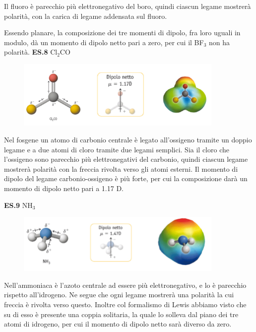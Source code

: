 Il fluoro è parecchio più elettronegativo del boro, quindi ciascun legame mostrerà polarità, con la carica di legame addensata sul fluoro.

Essendo planare, la composizione dei tre momenti di dipolo, fra loro uguali in modulo, dà un momento di dipolo netto pari a zero, per cui il BF$_3$ non ha polarità. 
\newpage
\vspace{0.2cm}\textbf{ES.8} Cl$_2$CO

\vspace{-0.3cm}\begin{figure}[htp]
    \centering
    \includegraphics[width=10cm]{immagini/Cl_2CO.png}
\end{figure}

\vspace{-0.3cm}Nel fosgene un atomo di carbonio centrale è legato all'ossigeno tramite un doppio legame e a due atomi di cloro tramite due legami semplici. Sia il cloro che l'ossigeno sono parecchio più elettronegativi del carbonio, quindi ciascun legame mostrerà polarità con la freccia rivolta verso gli atomi esterni. Il momento di dipolo del legame carbonio-ossigeno è più forte, per cui la composizione darà un momento di dipolo netto pari a 1.17 D.

\vspace{0.2cm}\textbf{ES.9} NH$_3$

\vspace{-0.3cm}\begin{figure}[htp]
    \centering
    \includegraphics[width=10cm]{immagini/NH_3.png}
\end{figure}

\vspace{-0.3cm}Nell'ammoniaca è l'azoto centrale ad essere più elettronegativo, e lo è parecchio rispetto all'idrogeno. Ne segue che ogni legame mostrerà una polarità la cui freccia è rivolta verso questo. Inoltre col formalismo di Lewis abbiamo visto che su di esso è presente una coppia solitaria, la quale lo solleva dal piano dei tre atomi di idrogeno, per cui il momento di dipolo netto sarà diverso da zero.

